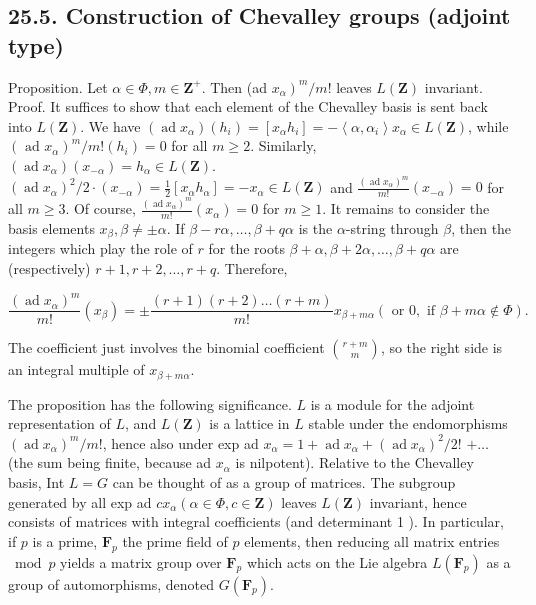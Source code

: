 \documentclass[10pt]{article}
\begin{document}
\subsection*{25.5. Construction of Chevalley groups (adjoint type)}
Proposition. Let $\alpha \in \Phi, m \in \mathbf{Z}^{+}$. Then (ad $\left.x_{\alpha}\right)^{m} / m!$ leaves $L(\mathbf{Z})$ invariant.\\
Proof. It suffices to show that each element of the Chevalley basis is sent back into $L(\mathbf{Z})$. We have $\left(\operatorname{ad} x_{\alpha}\right)\left(h_{i}\right)=\left[x_{\alpha} h_{i}\right]=-\left\langle\alpha, \alpha_{i}\right\rangle x_{\alpha} \in L(\mathbf{Z})$, while $\left(\text { ad } x_{\alpha}\right)^{m} / m!\left(h_{i}\right)=0$ for all $m \geq 2$. Similarly, $\left(\operatorname{ad} x_{\alpha}\right)\left(x_{-\alpha}\right)=h_{\alpha} \in L(\mathbf{Z})$. $\left(\operatorname{ad} x_{\alpha}\right)^{2} / 2 \cdot\left(x_{-\alpha}\right)=\frac{1}{2}\left[x_{\alpha} h_{\alpha}\right]=-x_{\alpha} \in L(\mathbf{Z})$ and $\frac{\left(\operatorname{ad} x_{\alpha}\right)^{m}}{m!}\left(x_{-\alpha}\right)=0$ for all $m \geq 3$. Of course, $\frac{\left(\operatorname{ad} x_{\alpha}\right)^{m}}{m!}\left(x_{\alpha}\right)=0$ for $m \geq 1$. It remains to consider the basis elements $x_{\beta}, \beta \neq \pm \alpha$. If $\beta-r \alpha, \ldots, \beta+q \alpha$ is the $\alpha$-string through $\beta$, then the integers which play the role of $r$ for the roots $\beta+\alpha, \beta+2 \alpha, \ldots, \beta+q \alpha$ are (respectively) $r+1, r+2, \ldots, r+q$. Therefore,

$$
\frac{\left(\operatorname{ad} x_{\alpha}\right)^{m}}{m!}\left(x_{\beta}\right)= \pm \frac{(r+1)(r+2) \ldots(r+m)}{m!} x_{\beta+m \alpha}(\text { or } 0, \text { if } \beta+m \alpha \notin \Phi) .
$$

The coefficient just involves the binomial coefficient $\binom{r+m}{m}$, so the right side is an integral multiple of $x_{\beta+m \alpha}$.

The proposition has the following significance. $L$ is a module for the adjoint representation of $L$, and $L(\mathbf{Z})$ is a lattice in $L$ stable under the endomorphisms $\left(\operatorname{ad} x_{\alpha}\right)^{m} / m!$, hence also under exp ad $x_{\alpha}=1+\operatorname{ad} x_{\alpha}+\left(\operatorname{ad} x_{\alpha}\right)^{2} / 2!$ $+\ldots$ (the sum being finite, because ad $x_{\alpha}$ is nilpotent). Relative to the Chevalley basis, Int $L=G$ can be thought of as a group of matrices. The subgroup generated by all exp ad $c x_{\alpha}(\alpha \in \Phi, c \in \mathbf{Z})$ leaves $L(\mathbf{Z})$ invariant, hence consists of matrices with integral coefficients (and determinant 1 ). In particular, if $p$ is a prime, $\mathbf{F}_{p}$ the prime field of $p$ elements, then reducing all matrix entries $\bmod p$ yields a matrix group over $\mathbf{F}_{p}$ which acts on the Lie algebra $L\left(\mathbf{F}_{p}\right)$ as a group of automorphisms, denoted $G\left(\mathbf{F}_{p}\right)$.
\end{document}
